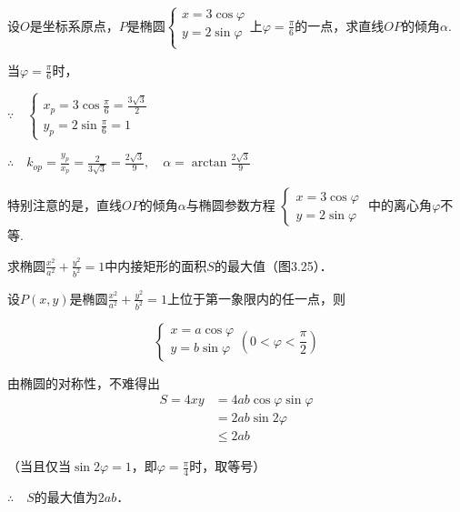 \begin{example}
    设$O$是坐标系原点，$P$是椭圆$\begin{cases}
        x=3\cos\varphi\\
        y=2\sin\varphi\\
    \end{cases}$上$\varphi=\frac{\pi}{6}$的一点，求直线$OP$的倾角$\alpha$.
\end{example}

\begin{solution}
当$\varphi=\frac{\pi}{6}$时，

$\because\quad \begin{cases}
    x_p=3\cos\frac{\pi}{6}=\frac{3\sqrt{3}}{2}\\[1.5ex]
    y_p=2\sin\frac{\pi}{6}=1
\end{cases}$

$\therefore\quad k_{op}=\frac{y_p}{x_p}=\frac{2}{3\sqrt{3}}=\frac{2\sqrt{3}}{9},\quad \alpha=\arctan \frac{2\sqrt{3}}{9}$

 特别注意的是，直线$OP$的倾角$\alpha$与椭圆参数方程
$\begin{cases}
    x=3\cos\varphi\\ y=2\sin\varphi
\end{cases}$    中的离心角$\varphi$不等.
\end{solution}



\begin{example}
    求椭圆$\frac{x^2}{a^2}+\frac{y^2}{b^2}=1$中内接矩形的面积$S$的最大值（图3.25）．
\end{example}

\begin{solution}
设$P(x,y)$是椭圆$\frac{x^2}{a^2}+\frac{y^2}{b^2}=1$上位于第一象限内的任一点，则

\noindent
\begin{minipage}{.52\textwidth}
\[\begin{cases}
    x=a\cos\varphi\\ y=b\sin\varphi
\end{cases}\left(0<\varphi<\frac{\pi}{2}\right)\]

由椭圆的对称性，不难得出
\[\begin{split}
    S=4xy&=4ab\cos\varphi \sin\varphi\\
    &=2ab\sin2\varphi\\
    &\le 2ab
\end{split} \]
\end{minipage}
\hfill
\begin{minipage}{.45\textwidth}
\centering
{}
\end{minipage}

（当且仅当$\sin2\varphi=1$，即$\varphi=\frac{\pi}{4}$时，取等号）

$\therefore\quad S$的最大值为$2ab$．
\end{solution}

